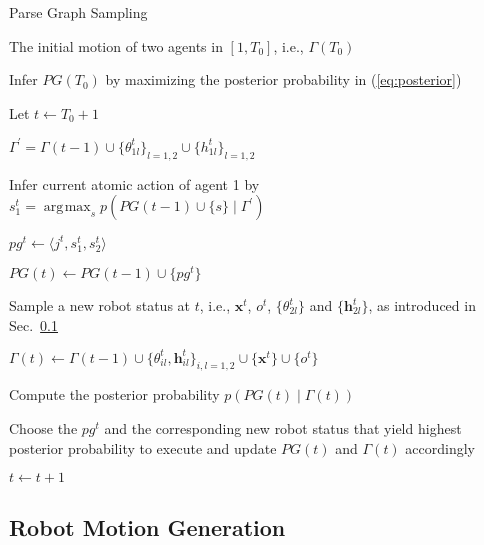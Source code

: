 \documentclass[letterpaper, 10 pt, conference]{ieeeconf}  %
\DeclareMathOperator*{\argmax}{\arg\!\max}
\def \hb{\bm{h}} %
\def \xb{\bm{x}} %
\begin{document}
\begin{algorithm}[t]\scriptsize
\caption{Parse Graph Sampling}
\label{alg:pgsampling}
\begin{algorithmic}[1]
\small

\INPUT The initial motion of two agents in $[1, T_0]$, i.e., $\Gamma(T_0)$

\State Infer $PG(T_0)$ by maximizing the posterior probability in (\ref{eq:posterior})

\State Let $t \leftarrow T_0 + 1$

\Repeat

    \State $\Gamma^\prime = \Gamma(t-1) \cup \{\theta_{1l}^t\}_{l=1,2} \cup \{h_{1l}^t\}_{l=1,2}$

    \State \parbox[t]{\dimexpr0.9\linewidth-\algorithmicindent}{Infer current atomic action of agent 1 by\newline $s_1^t = \argmax_{s} p(PG(t - 1) \cup \{s\} \mid \Gamma^\prime)$\strut}
    
        
        \State $pg^t \leftarrow \langle j^t, s_1^t, s_2^t \rangle$
        
        \State $PG(t) \leftarrow PG(t - 1) \cup \{pg^t\}$
        
        \State \parbox[t]{\dimexpr0.9\linewidth-\algorithmicindent}{Sample a new robot status at $t$, i.e., $\xb^t$, $o^t$, $\{\theta_{2l}^t\}$ and $\{\hb_{2l}^t\}$, as introduced in Sec.~\ref{sec:robotmotion} \strut}
        
        \State $\Gamma(t) \leftarrow \Gamma(t - 1) \cup \{\theta_{il}^t, \hb_{il}^t\}_{i,l=1,2} \cup \{\xb^t\} \cup \{o^t\}$
        
        \State Compute the posterior probability $p(PG(t) \mid \Gamma(t))$
        
    \EndFor
    
    \State \parbox[t]{\dimexpr0.95\linewidth-\algorithmicindent}{Choose the $pg^t$ and the corresponding new robot status that yield highest posterior probability to execute and update $PG(t)$ and $\Gamma(t)$ accordingly\strut}
    
    \State $t \leftarrow t + 1$
    
\end{algorithmic}
\end{algorithm}



\subsection{Robot Motion Generation}
\label{sec:robotmotion}
\end{document}
